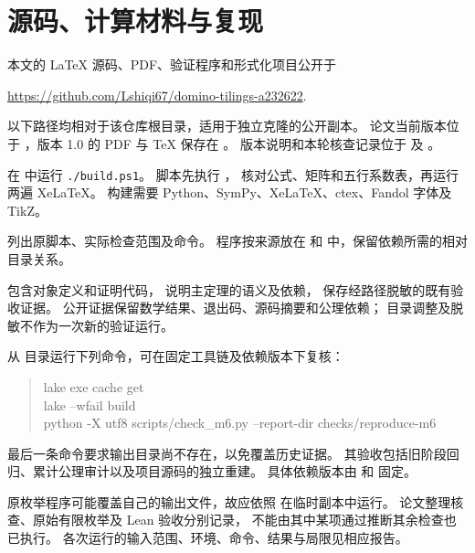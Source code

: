 \section{源码、计算材料与复现}\label{app:repro}

本文的 LaTeX 源码、PDF、验证程序和形式化项目公开于
\begin{center}
\url{https://github.com/Lshiqi67/domino-tilings-a232622}.
\end{center}
以下路径均相对于该仓库根目录，适用于独立克隆的公开副本。
论文当前版本位于 ，版本 1.0 的 PDF 与 TeX
保存在 。
版本说明和本轮核查记录位于 
及 。

\begin{description}[style=nextline,leftmargin=2em]
\item[论文构建]
在  中运行 \texttt{./build.ps1}。
脚本先执行 ，
核对公式、矩阵和五行系数表，再运行两遍 XeLaTeX。
构建需要 Python、SymPy、XeLaTeX、ctex、Fandol 字体及 TikZ。
\item[基本块和半棋盘程序]
 列出原脚本、实际检查范围及命令。
程序按来源放在  和
 中，保留依赖所需的相对目录关系。
\item[形式化源码与证据]
 包含对象定义和证明代码，
 说明主定理的语义及依赖，
 保存经路径脱敏的既有验收证据。
公开证据保留数学结果、退出码、源码摘要和公理依赖；
目录调整及脱敏不作为一次新的验证运行。
\end{description}

从  目录运行下列命令，可在固定工具链及依赖版本下复核：
\begin{quote}\small\ttfamily
lake exe cache get\\
lake --wfail build\\
python -X utf8 scripts/check\_m6.py --report-dir checks/reproduce-m6
\end{quote}
最后一条命令要求输出目录尚不存在，以免覆盖历史证据。
其验收包括旧阶段回归、累计公理审计以及项目源码的独立重建。
具体依赖版本由  和
 固定。

原枚举程序可能覆盖自己的输出文件，故应依照
 在临时副本中运行。
论文整理核查、原始有限枚举及 Lean 验收分别记录，
不能由其中某项通过推断其余检查也已执行。
各次运行的输入范围、环境、命令、结果与局限见相应报告。

